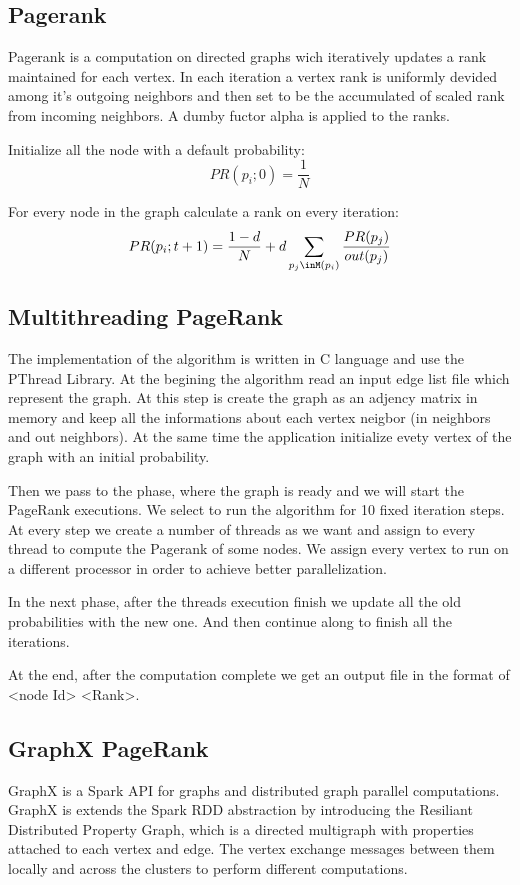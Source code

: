 \documentclass[paper=a4, fontsize=11pt]{scrartcl} %
\numberwithin{equation}{section} %
\numberwithin{figure}{section} %
\numberwithin{table}{section} %
\begin{document}
\subsection{Pagerank}
Pagerank is a computation on directed graphs wich iteratively updates a rank
maintained for each vertex. In each iteration a vertex rank is uniformly
devided among it's outgoing neighbors and then set to be the accumulated of
scaled rank from incoming neighbors. A dumby fuctor alpha is applied to the
ranks.

Initialize all the node with a default probability: 
$$PR(p_i;0) = \frac{1}{N}$$
                
For every node in the graph calculate a rank on every iteration: 
$$PR(p_i;{t+1}) = \frac{1-d}{N} + d\sum_{p_j\inM(p_i)}\frac{PR(p_j)}{out(p_j)}$$ 

\subsection{Multithreading PageRank}

The implementation of the algorithm is written in C language and use the PThread
Library. At the begining the algorithm read an input edge list file which
represent the graph. At this step is create the graph as an adjency matrix in
memory and keep all the informations about each vertex neigbor (in neighbors and
out neighbors). At the same time the application initialize evety vertex of the
graph with an initial probability. 

Then we pass to the phase, where the graph is ready and we will start the
PageRank executions. We select to run the algorithm for 10 fixed iteration
steps. At every step we create a number of threads as we want and assign to
every thread to compute the Pagerank of some nodes. We assign every vertex to
run on a different processor in order to achieve better parallelization.

In the next phase, after the threads execution finish we update all the old
probabilities with the new one. And then continue along to finish all the
iterations.

At the end, after the computation complete we get an output file in the format
of <node Id> <Rank>. 

\subsection{GraphX PageRank}
GraphX is a Spark API for graphs and distributed graph parallel computations.
GraphX is extends the Spark RDD abstraction by introducing the Resiliant
Distributed Property Graph, which is a directed multigraph with properties
attached to each vertex and edge. The vertex exchange messages between them
locally and across the clusters to perform different computations.
\end{document}
